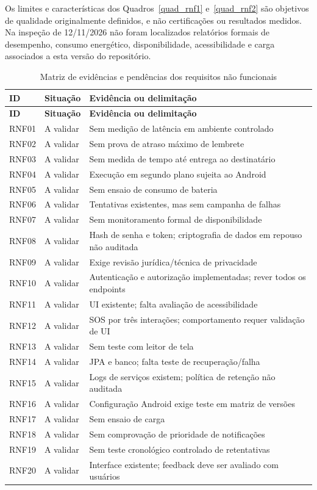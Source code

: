 Os limites e características dos Quadros~\ref{quad_rnf1} e~\ref{quad_rnf2} são objetivos de qualidade originalmente definidos, e não certificações ou resultados medidos. Na inspeção de 12/11/2026 não foram localizados relatórios formais de desempenho, consumo energético, disponibilidade, acessibilidade e carga associados a esta versão do repositório.

\begin{longtable}{p{1.25cm}p{2.2cm}p{10.0cm}}
\caption{Matriz de evidências e pendências dos requisitos não funcionais}\label{tab_status_rnf}\\
\hline
\textbf{ID} & \textbf{Situação} & \textbf{Evidência ou delimitação} \\
\hline
\endfirsthead
\hline
\textbf{ID} & \textbf{Situação} & \textbf{Evidência ou delimitação} \\
\hline
\endhead
RNF01 & A validar & Sem medição de latência em ambiente controlado \\
\hline
RNF02 & A validar & Sem prova de atraso máximo de lembrete \\
\hline
RNF03 & A validar & Sem medida de tempo até entrega ao destinatário \\
\hline
RNF04 & A validar & Execução em segundo plano sujeita ao Android \\
\hline
RNF05 & A validar & Sem ensaio de consumo de bateria \\
\hline
RNF06 & A validar & Tentativas existentes, mas sem campanha de falhas \\
\hline
RNF07 & A validar & Sem monitoramento formal de disponibilidade \\
\hline
RNF08 & A validar & Hash de senha e token; criptografia de dados em repouso não auditada \\
\hline
RNF09 & A validar & Exige revisão jurídica/técnica de privacidade \\
\hline
RNF10 & A validar & Autenticação e autorização implementadas; rever todos os endpoints \\
\hline
RNF11 & A validar & UI existente; falta avaliação de acessibilidade \\
\hline
RNF12 & A validar & SOS por três interações; comportamento requer validação de UI \\
\hline
RNF13 & A validar & Sem teste com leitor de tela \\
\hline
RNF14 & A validar & JPA e banco; falta teste de recuperação/falha \\
\hline
RNF15 & A validar & Logs de serviços existem; política de retenção não auditada \\
\hline
RNF16 & A validar & Configuração Android exige teste em matriz de versões \\
\hline
RNF17 & A validar & Sem ensaio de carga \\
\hline
RNF18 & A validar & Sem comprovação de prioridade de notificações \\
\hline
RNF19 & A validar & Sem teste cronológico controlado de retentativas \\
\hline
RNF20 & A validar & Interface existente; feedback deve ser avaliado com usuários \\
\hline
\end{longtable}

